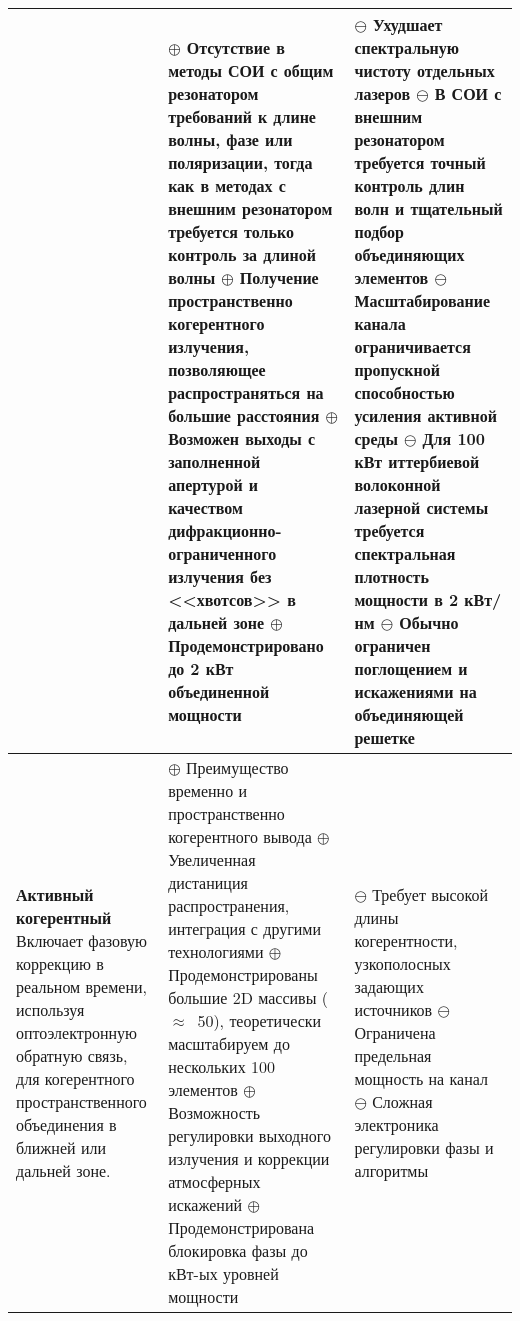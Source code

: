 \begin{longtable}[c]{ | p{4cm} | p{6cm} | p{6cm} |}
    &
      $\oplus$ Отсутствие в методы СОИ с общим резонатором требований к длине волны, фазе или поляризации, тогда как в методах с внешним резонатором требуется только контроль за длиной волны
      \newline$\oplus$ Получение пространственно когерентного излучения, позволяющее распространяться на большие расстояния
      \newline$\oplus$ Возможен выходы с заполненной апертурой и качеством дифракционно-ограниченного излучения без <<хвотсов>> в дальней зоне
      \newline$\oplus$ Продемонстрировано до 2 кВт объединенной мощности
    &
      $\ominus$ Ухудшает спектральную чистоту отдельных лазеров
      \newline$\ominus$ В СОИ с внешним резонатором требуется точный контроль длин волн и тщательный подбор объединяющих элементов
      \newline$\ominus$ Масштабирование канала ограничивается пропускной способностью усиления активной среды
      \newline$\ominus$ Для 100 кВт иттербиевой волоконной лазерной системы требуется спектральная плотность мощности в 2 кВт/нм
      \newline$\ominus$ Обычно ограничен поглощением и искажениями на объединяющей решетке
    \\
  \hline
    \textbf{Активный когерентный}
    \newline\newline
    Включает фазовую коррекцию в реальном времени, используя оптоэлектронную обратную связь, для когерентного пространственного объединения в ближней или дальней зоне.
    &
      $\oplus$ Преимущество временно и пространственно когерентного вывода
      \newline$\oplus$  Увеличенная дистаниция распространения, интеграция с другими технологиями
      \newline$\oplus$  Продемонстрированы большие 2D массивы ($\approx$~50), теоретически масштабируем до нескольких 100 элементов
      \newline$\oplus$  Возможность регулировки выходного излучения и коррекции атмосферных искажений
      \newline$\oplus$ Продемонстрирована блокировка фазы до кВт-ых уровней мощности
    &
      $\ominus$ Требует высокой длины когерентности, узкополосных задающих источников
      \newline$\ominus$ Ограничена предельная мощность на канал
      \newline$\ominus$ Сложная электроника регулировки фазы и алгоритмы

\end{longtable}
